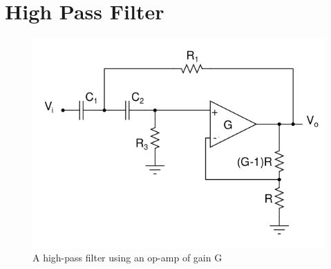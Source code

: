 \documentclass[11pt, a4paper]{article}
\begin{document}
\section{High Pass Filter}
\begin{figure}[!tbh]
   	\centering
   	\includegraphics[scale=0.5]{fig7.png}  %
   	\caption{A high-pass filter using an op-amp of gain G}
   	\label{fig:sample}
   \end{figure}
   
\end{document}
